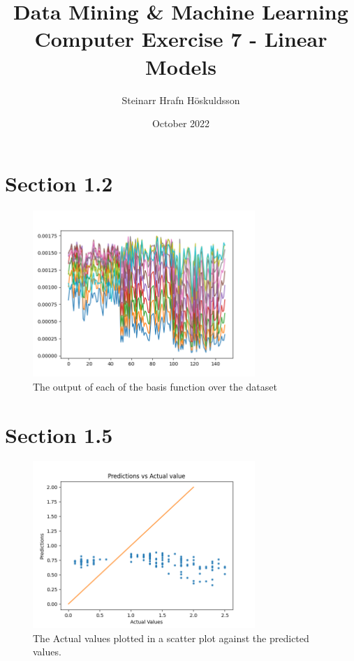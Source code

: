 \documentclass{article}
\title{Data Mining \& Machine Learning \\ \large Computer Exercise 7 - Linear Models}
\author{Steinarr Hrafn Höskuldsson}
\date{October 2022}
\newcommand{\mycomment}[1]{}
\begin{document}
\maketitle
\mycomment{
\begin{figure}[h]
    \centering
    \texttt{[image: LAB3/Basic1.png]}
    \caption{"Switch test" Breadboard set up}
    \label{fig:Switch_test}
\end{figure}



}
\section*{Section 1.2}

\begin{figure}[H]
    \centering
    \includegraphics[width=0.75\textwidth]{07_linear_models/plot_1_2.png}
    \caption{The output of each of the basis function over the dataset}
    \label{fig:section12}
\end{figure}

\section*{Section 1.5}
\begin{figure}[H]
    \centering
    \includegraphics[width=0.75\textwidth]{07_linear_models/plot_1_5_org.png}
    \caption{The Actual values plotted in a scatter plot against the predicted values.}
    \label{fig:section15}
\end{figure}
\end{document}
